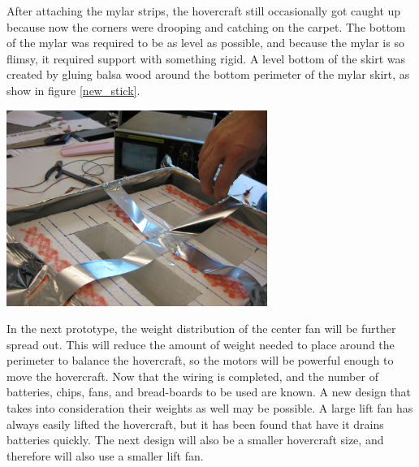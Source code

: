 After attaching the mylar strips, the hovercraft still occasionally got caught up because now the corners 
were drooping and catching on the carpet. The bottom of the mylar was required to be as level as possible, 
and because the mylar is so flimsy, it required support with something rigid. A level bottom of the skirt
was created by gluing balsa wood around the bottom perimeter of the mylar skirt, as show in figure \ref{new_stick}.

\begin{minipage}{6.5in}
\begin{center}
  \includegraphics[width=85mm]{imageSources/designProblemsnew_stick.png}
\end{center}
\label{new_stick}
\end{minipage}

In the next prototype, the weight distribution of the center fan will be further spread out. This will reduce the amount of weight needed to place around the perimeter to balance the hovercraft, so the motors will be powerful enough to move the hovercraft. Now that the wiring is completed, and the number of batteries, chips, fans, and bread-boards to be used are known.  A new design that takes into consideration their weights as well may be possible. A large lift fan has always easily lifted the hovercraft, but it has been found that have it drains batteries quickly.  The next design will also be a smaller hovercraft size, and therefore will also use a smaller lift fan.

